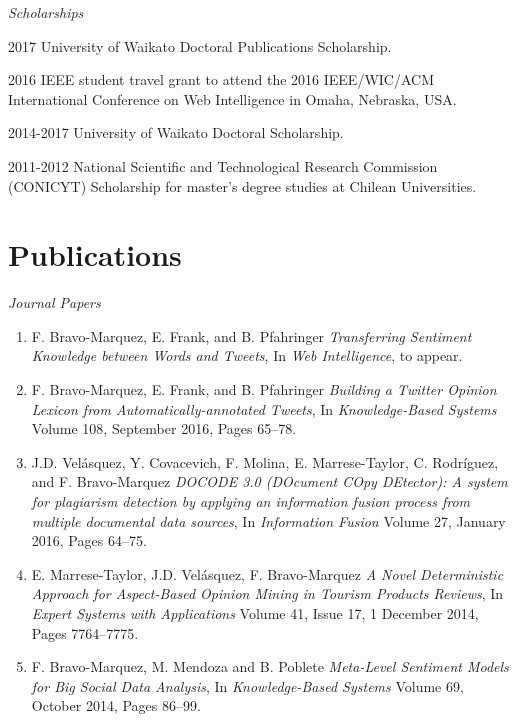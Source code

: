 \documentclass[letterpaper]{article}
\begin{document}
\begin{flushleft}
\emph{Scholarships}
\end{flushleft}

\begin{CV}

\item[2017] University of Waikato Doctoral Publications Scholarship.

\item[2016] IEEE student travel grant to attend the 2016
IEEE/WIC/ACM International Conference on Web Intelligence in Omaha, Nebraska, USA.

\item[2014-2017]  University of Waikato Doctoral Scholarship.

\item[2011-2012]  National Scientific and Technological Research Commission (CONICYT) Scholarship for master's degree studies at Chilean Universities.



\end{CV}



\section{Publications}

\begin{flushleft}
\emph{Journal Papers}
\end{flushleft}

\begin{enumerate}


\item F. Bravo-Marquez, E. Frank, and B. Pfahringer \textit{Transferring Sentiment Knowledge between Words and Tweets}, In \textit{Web Intelligence}, to appear.

\item F. Bravo-Marquez, E. Frank, and B. Pfahringer \textit{Building a Twitter Opinion Lexicon from Automatically-annotated Tweets}, In \textit{Knowledge-Based Systems}  Volume 108, September 2016, Pages 65–78.

\item J.D. Velásquez, Y. Covacevich, F. Molina, E. Marrese-Taylor, C. Rodríguez, and F. Bravo-Marquez \textit{DOCODE 3.0 (DOcument COpy DEtector): A system for plagiarism detection by applying an information fusion process from multiple documental data sources}, In \textit{Information Fusion} Volume 27, January 2016, Pages 64–75. 


\item E. Marrese-Taylor, J.D. Velásquez, F. Bravo-Marquez \textit{A Novel Deterministic Approach for Aspect-Based Opinion Mining in Tourism Products Reviews}, In \textit{Expert Systems with Applications} Volume 41, Issue 17, 1 December 2014, Pages 7764–7775. 


\item F. Bravo-Marquez, M. Mendoza and B. Poblete \textit{Meta-Level Sentiment Models for Big Social Data Analysis}, In \textit{Knowledge-Based Systems} Volume 69, October 2014, Pages 86–99. 

\end{enumerate}
\end{document}

